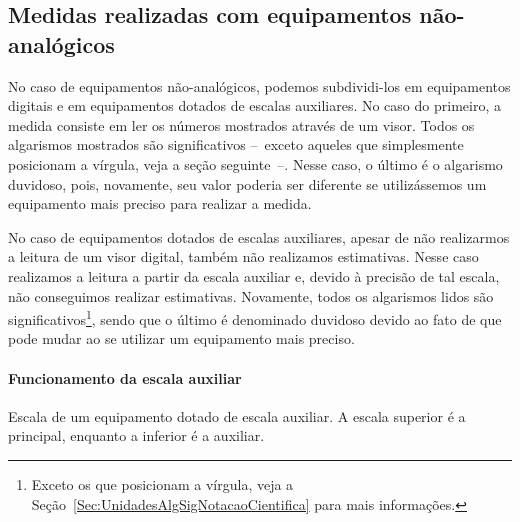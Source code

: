 \subsection{Medidas realizadas com equipamentos não-analógicos}

No caso de equipamentos não-analógicos, podemos subdividi-los em equipamentos digitais e em equipamentos dotados de escalas auxiliares. No caso do primeiro, a medida consiste em ler os números mostrados através de um visor. Todos os algarismos mostrados são significativos --~exceto aqueles que simplesmente posicionam a vírgula, veja a seção seguinte~--. Nesse caso, o último é o algarismo duvidoso, pois, novamente, seu valor poderia ser diferente se utilizássemos um equipamento mais preciso para realizar a medida.

No caso de equipamentos dotados de escalas auxiliares, apesar de não realizarmos a leitura de um visor digital, também não realizamos estimativas. Nesse caso realizamos a leitura a partir da escala auxiliar e, devido à precisão de tal escala, não conseguimos realizar estimativas. Novamente, todos os algarismos lidos são significativos\footnote{Exceto os que posicionam a vírgula, veja a Seção~\ref{Sec:UnidadesAlgSigNotacaoCientifica} para mais informações.}, sendo que o último é denominado duvidoso devido ao fato de que pode mudar ao se utilizar um equipamento mais preciso.

\paragraph{Funcionamento da escala auxiliar}

\begin{marginfigure}[2 cm]
\centering
{}
\caption{Escala de um equipamento dotado de escala auxiliar. A escala superior é a principal, enquanto a inferior é a auxiliar.\label{Fig:NonioFechado}}
\end{marginfigure}


